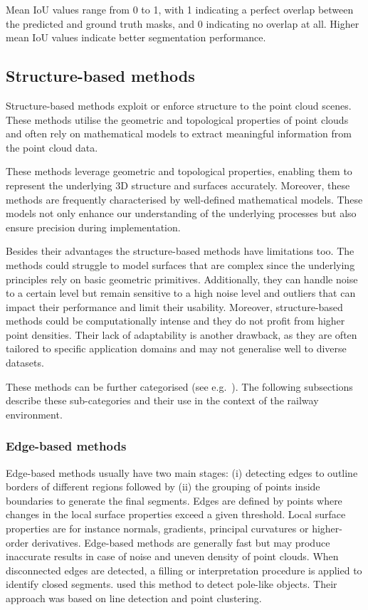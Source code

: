 Mean IoU values range from 0 to 1, with 1 indicating a perfect overlap between the predicted and ground truth masks, and 0 indicating no overlap at all. Higher mean IoU values indicate better segmentation performance.

\subsection{Structure-based methods}\label{subsec:stoa:structure based methods}
Structure-based methods exploit or enforce structure to the point cloud scenes. These methods utilise the geometric and topological properties of point clouds and often rely on mathematical models to extract meaningful information from the point cloud data. 

These methods leverage geometric and topological properties, enabling them to represent the underlying 3D structure and surfaces accurately. Moreover, these methods are frequently characterised by well-defined mathematical models. These models not only enhance our understanding of the underlying processes but also ensure precision during implementation.

Besides their advantages the structure-based methods have limitations too. The methods could struggle to model surfaces that are complex since the underlying principles rely on basic geometric primitives. Additionally, they can handle noise to a certain level but remain sensitive to a high noise level and outliers that can impact their performance and limit their usability. Moreover, structure-based methods could be computationally intense and they do not profit from higher point densities. Their lack of adaptability is another drawback, as they are often tailored to specific application domains and may not generalise well to diverse datasets.  

These methods can be further categorised (see e.g.~\cite{grilli_review_2017,nguyen_3d_2013}). The following subsections describe these sub-categories and their use in the context of the railway environment. 

\subsubsection{Edge-based methods}
Edge-based methods usually have two main stages: (i) detecting edges to outline borders of different regions followed by (ii) the grouping of points inside boundaries to generate the final segments. Edges are defined by points where changes in the local surface properties exceed a given threshold. Local surface properties are for instance normals, gradients, principal curvatures or higher-order derivatives. Edge-based methods are generally fast but may produce inaccurate results in case of noise and uneven density of point clouds. When disconnected edges are detected, a filling or interpretation procedure is applied to identify closed segments.
\citeauthor{ariyachandra2020detection} \cite{ariyachandra2020detection} used this method to detect pole-like objects. Their approach was based on line detection and point clustering. 

